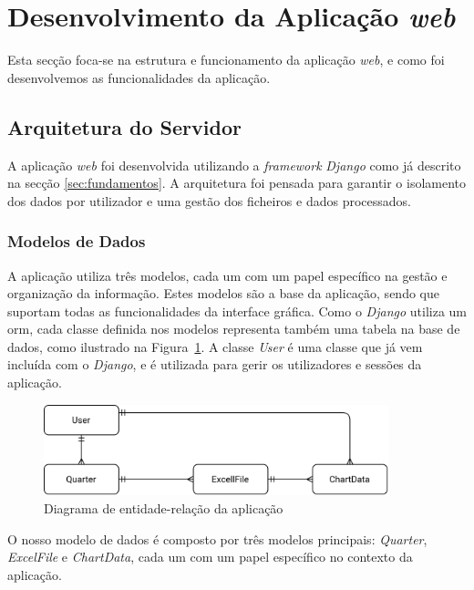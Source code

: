 \section{Desenvolvimento da Aplicação \textit{web}}

Esta secção foca-se na estrutura e funcionamento da aplicação \textit{web}, e como foi desenvolvemos as funcionalidades da aplicação.

\subsection{Arquitetura do Servidor}

A aplicação \textit{web} foi desenvolvida utilizando a \textit{framework} \textit{Django} como já descrito na secção \ref{sec:fundamentos}. A arquitetura foi pensada para garantir o isolamento dos dados por utilizador e uma gestão dos ficheiros e dados processados.

\subsubsection{Modelos de Dados}

A aplicação utiliza três modelos, cada um com um papel específico na gestão e organização da informação. Estes modelos são a base da aplicação, sendo que suportam todas as funcionalidades da interface gráfica. Como o \textit{Django} utiliza um \gls{orm}, cada classe definida nos modelos representa também uma tabela na base de dados, como ilustrado na Figura~\ref{fig:er-diagram}. A classe \textit{User} é uma classe que já vem incluída com o \textit{Django}, e é utilizada para gerir os utilizadores e sessões da aplicação.

\begin{figure}[H]
    \centering
    \includegraphics[max width=10cm]{./img/er-diagram.png}
 \caption{Diagrama de entidade-relação da aplicação}
 \label{fig:er-diagram}
 \end{figure}

O nosso modelo de dados é composto por três modelos principais: \textit{Quarter}, \textit{ExcelFile} e \textit{ChartData}, cada um com um papel específico no contexto da aplicação.

